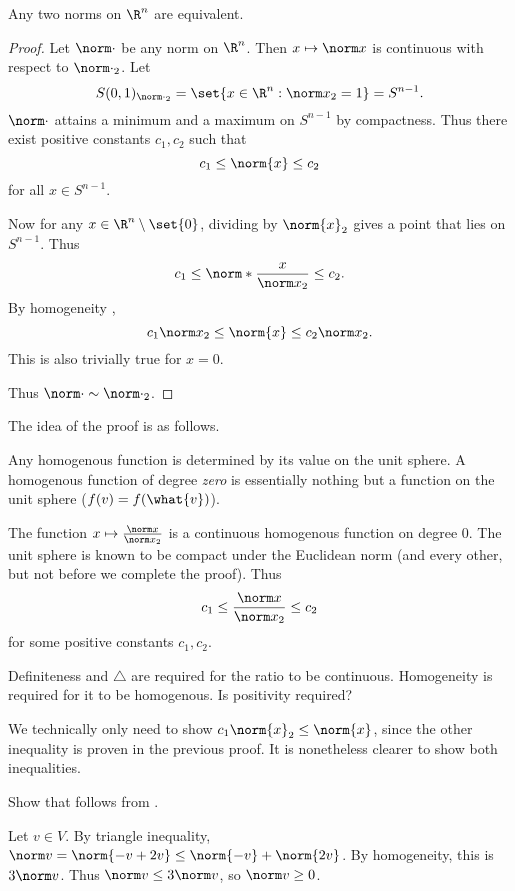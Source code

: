 \begin{theorem*} \label{thm:norm:eq}
    Any two norms on $\R^n$ are equivalent.
\end{theorem*}
\begin{proof}
    Let $\norm\cdot$ be any norm on $\R^n$.
    Then $x \mapsto \norm x$ is continuous with respect to ${\norm\cdot}_2$.
    Let \[
        S(0, 1)_{{\norm\cdot}_2} = \set{x \in \R^n : {\norm x}_2 = 1}
                      = S^{n-1}.
    \] $\norm\cdot$ attains a minimum and a maximum on $S^{n-1}$
    by compactness.
    Thus there exist positive constants $c_1, c_2$ such that \[
        c_1 \le \norm{x} \le c_2
    \] for all $x \in S^{n-1}$.

    Now for any $x \in \R^n \setminus \set{0}$,
    dividing by $\norm{x}_2$ gives a point that lies on $S^{n-1}$.
    Thus \[
        c_1 \le \norm*{\frac{x}{{\norm x}_2}} \le c_2.
    \] By homogeneity , \[
        c_1 {\norm x}_2 \le \norm{x} \le c_2 {\norm x}_2.
    \] This is also trivially true for $x = 0$.

    Thus $\norm\cdot \sim {\norm\cdot}_2$.
\end{proof}
\begin{remark}
    The idea of the proof is as follows.

    Any homogenous function is determined by its value on the unit sphere.
    A homogenous function of degree \emph{zero} is essentially nothing but
    a function on the unit sphere ($f(v) = f(\what{v})$).

    The function $x \mapsto \frac{\norm x}{{\norm x}_2}$ is a
    continuous homogenous function on degree $0$.
    The unit sphere is known to be compact under the Euclidean norm
    (and every other, but not before we complete the proof).
    Thus \[
        c_1 \le \frac{\norm x}{{\norm x}_2} \le c_2
    \] for some positive constants $c_1, c_2$.

    Definiteness and $\triangle$ are required for the ratio to be
    continuous.
    Homogeneity is required for it to be homogenous.
    Is positivity required? %
\end{remark}
\begin{remark}
    We technically only need to show $c_1 \norm{x}_2 \le \norm{x}$,
    since the other inequality is proven in the previous proof.
    It is nonetheless clearer to show both inequalities.
\end{remark}

\begin{exercise*}[Self]
    Show that  follows from
    .
\end{exercise*}
\begin{solution}
    Let $v \in V$.
    By triangle inequality,
    $\norm v = \norm{-v + 2v} \le \norm{-v} + \norm{2v}$.
    By homogeneity, this is $3\norm v$.
    Thus $\norm v \le 3\norm v$, so $\norm v \ge 0$.
\end{solution}

